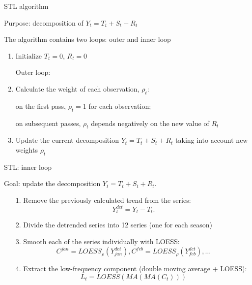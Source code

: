 \begin{frame}{STL algorithm}
	
	Purpose: decomposition of $Y_t = T_t + S_t + R_t$
	
	The algorithm contains two loops: \alert{outer} and \alert{inner} loop
	
	\begin{enumerate}[<+->]
		
		\item Initialize $T_t = 0$, $R_t = 0$
		
		\alert{Outer} loop:
		
		\item Calculate the weight of each observation, $\rho_t$:
		
		on the first pass, $\rho_t = 1$ for each observation;
		
		on subsequent passes, $\rho_t$ depends negatively on the new value of $R_t$
		
		\item Update the current decomposition $Y_t = T_t + S_t + R_t$ taking into account new weights $\rho_t$
	\end{enumerate}
	
\end{frame}



\begin{frame}{STL: inner loop}
	
	Goal: update the decomposition $Y_t = T_t + S_t + R_t$.
	
	\begin{enumerate}[<+->]
		
		\item[1.] Remove the previously calculated trend from the series:
		\[
		Y_t^{det} = Y_t - T_t.
		\]
		
		\item[2.] Divide the detrended series into 12 series (one for each season)
		
		\item[3.] Smooth each of the series individually with LOESS:
		\[
		C^{jan} = LOESS_{\rho}(Y^{det}_{jan}), C^{feb} = LOESS_{\rho}(Y^{det}_{feb}), \ldots
		\]
		
		\item[4.] Extract the low-frequency component (double moving average + LOESS):
		\[
		L_t = LOESS(MA(MA(C_t)))
		\]
	\end{enumerate}
	
	
\end{frame}



